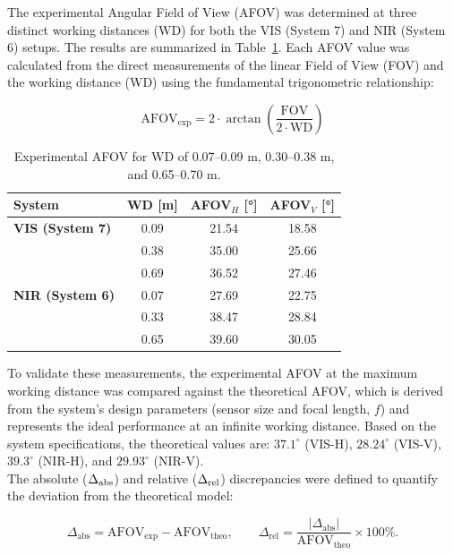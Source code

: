 \noindent The experimental Angular Field of View (AFOV) was determined at three distinct working distances (WD) for both the VIS (System 7) and NIR (System 6) setups. The results are summarized in Table~\ref{tab:afov_exp}. Each AFOV value was calculated from the direct measurements of the linear Field of View (FOV) and the working distance (WD) using the fundamental trigonometric relationship:

\begin{equation}
\label{eq:afov_experimental}
\mathrm{AFOV}_{\mathrm{exp}} = 2 \cdot \arctan\left(\frac{\mathrm{FOV}}{2 \cdot \mathrm{WD}}\right)
\end{equation}

\begin{table}[H]
\centering
\caption{Experimental AFOV for WD of 0.07–0.09 m, 0.30–0.38 m, and 0.65–0.70 m.}
\label{tab:afov_exp}
\begin{tabular}{lccc}
    \toprule
    System & WD [m] & AFOV$_H$ [°] & AFOV$_V$ [°] \\
    \midrule
    \textbf{VIS (System 7)} 
    & 0.09 & 21.54 & 18.58 \\
    & 0.38 & 35.00 & 25.66 \\
    & 0.69 & 36.52 & 27.46 \\
    \midrule
    \textbf{NIR (System 6)} 
    & 0.07 & 27.69 & 22.75 \\
    & 0.33 & 38.47 & 28.84 \\
    & 0.65 & 39.60 & 30.05 \\
    \bottomrule
\end{tabular}
\end{table}

\noindent To validate these measurements, the experimental AFOV at the maximum working distance was compared against the theoretical AFOV, which is derived from the system's design parameters (sensor size and focal length, $f$) and represents the ideal performance at an infinite working distance. Based on the system specifications, the theoretical values are: $37.1^\circ$ (VIS-H), $28.24^\circ$ (VIS-V), $39.3^\circ$ (NIR-H), and $29.93^\circ$ (NIR-V).\\

\noindent The absolute ($\Delta_{\rm abs}$) and relative ($\Delta_{\rm rel}$) discrepancies were defined to quantify the deviation from the theoretical model:

\begin{equation}
\label{eq:discrepancy}
\Delta_{\mathrm{abs}} = \mathrm{AFOV}_{\mathrm{exp}} - \mathrm{AFOV}_{\mathrm{theo}},
\qquad
\Delta_{\mathrm{rel}} = \frac{|\Delta_{\mathrm{abs}}|}{\mathrm{AFOV}_{\mathrm{theo}}} \times 100\%.
\end{equation}

